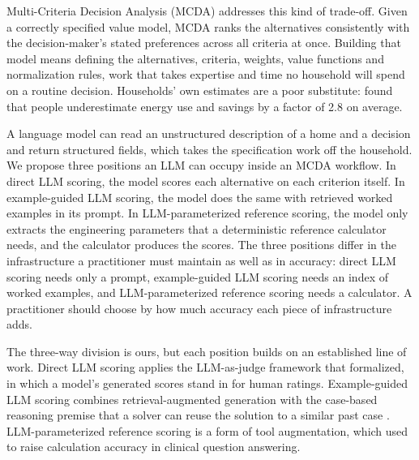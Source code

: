 \documentclass[final,3p,times]{elsarticle}
\begin{document}
Multi-Criteria Decision Analysis (MCDA) \cite{huang2011} addresses this kind of trade-off. Given a correctly specified value model, MCDA ranks the alternatives consistently with the decision-maker's stated preferences across all criteria at once. Building that model means defining the alternatives, criteria, weights, value functions and normalization rules, work that takes expertise and time no household will spend on a routine decision. Households' own estimates are a poor substitute: \citet{attari2010} found that people underestimate energy use and savings by a factor of 2.8 on average.

A language model can read an unstructured description of a home and a decision and return structured fields, which takes the specification work off the household. We propose three positions an LLM can occupy inside an MCDA workflow. In direct LLM scoring, the model scores each alternative on each criterion itself. In example-guided LLM scoring, the model does the same with retrieved worked examples in its prompt. In LLM-parameterized reference scoring, the model only extracts the engineering parameters that a deterministic reference calculator needs, and the calculator produces the scores. The three positions differ in the infrastructure a practitioner must maintain as well as in accuracy: direct LLM scoring needs only a prompt, example-guided LLM scoring needs an index of worked examples, and LLM-parameterized reference scoring needs a calculator. A practitioner should choose by how much accuracy each piece of infrastructure adds.

The three-way division is ours, but each position builds on an established line of work. Direct LLM scoring applies the LLM-as-judge framework that \citet{zheng2023judging} formalized, in which a model's generated scores stand in for human ratings. Example-guided LLM scoring combines retrieval-augmented generation \cite{lewis2020} with the case-based reasoning premise that a solver can reuse the solution to a similar past case \cite{aamodtplaza1994,minorkaucher2024}. LLM-parameterized reference scoring is a form of tool augmentation, which \citet{goodell2025} used to raise calculation accuracy in clinical question answering.
\end{document}
